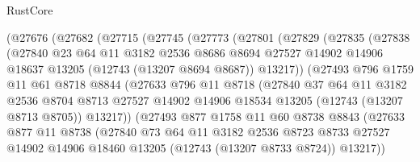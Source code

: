 \begin{lexlean}{RustCore}
\begin{coremodule}
        (@27676
          (@27682
            (@27715
              (@27745
                (@27773
                  (@27801
                    (@27829
                      (@27835
                        (@27838
                          (@27840
                            @23
                            @64
                            @11
                            @3182
                            @2536
                            @8686
                            @8694
                            @27527
                            @14902
                            @14906
                            @18637
                            @13205
                            (@12743 (@13207 @8694 @8687))
                            @13217))
                        (@27493
                          @796
                          @1759
                          @11
                          @61
                          @8718
                          @8844
                          (@27633
                            @796
                            @11
                            @8718
                            (@27840
                              @37
                              @64
                              @11
                              @3182
                              @2536
                              @8704
                              @8713
                              @27527
                              @14902
                              @14906
                              @18534
                              @13205
                              (@12743 (@13207 @8713 @8705))
                              @13217))
                          (@27493
                            @877
                            @1758
                            @11
                            @60
                            @8738
                            @8843
                            (@27633
                              @877
                              @11
                              @8738
                              (@27840
                                @73
                                @64
                                @11
                                @3182
                                @2536
                                @8723
                                @8733
                                @27527
                                @14902
                                @14906
                                @18460
                                @13205
                                (@12743 (@13207 @8733 @8724))
                                @13217))

\end{coremodule}
\end{lexlean}
